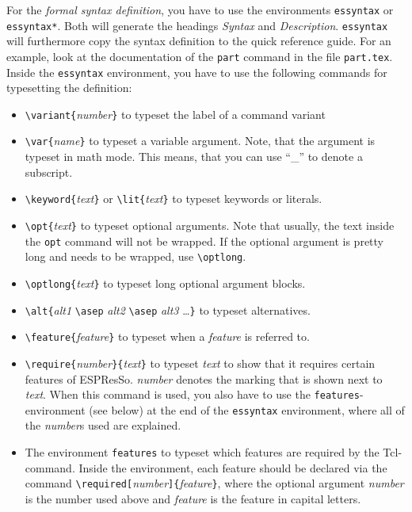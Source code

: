 \documentclass[
a4paper,                        %
11pt,                           %
twoside,                        %
footsepline,                    %
headsepline,                    %
headexclude,                    %
footexclude,                    %
pagesize,                       %
bibtotocnumbered,               %
idxtotoc                        %
]{scrreprt}
\newcommand{\es}{\mbox{\textsf{ESPResSo}}\xspace}
\begin{document}
For the \emph{formal syntax definition}, you have to use the
environments \texttt{essyntax} or \texttt{essyntax*}.  Both will
generate the headings \emph{Syntax} and
\emph{Description}. \texttt{essyntax} will furthermore copy the syntax
definition to the quick reference guide.  For an example, look at the
documentation of the \texttt{part} command in the file
\texttt{part.tex}. Inside the \texttt{essyntax} environment, you have
to use the following commands for typesetting the definition:
\begin{itemize}
\item \verb!\variant{!\textit{number}\verb!}! to typeset the label of a
  command variant
\item \verb!\var{!\textit{name}\verb!}! to typeset a variable
  argument. Note, that the argument is typeset in math mode.  This
  means, that you can use ``\_'' to denote a subscript.
\item \verb!\keyword{!\textit{text}\verb!}! or
  \verb!\lit{!\textit{text}\verb!}! to typeset keywords or literals.
\item \verb!\opt{!\textit{text}\verb!}! to typeset optional
  arguments. Note that usually, the text inside the \texttt{opt}
  command will not be wrapped. If the optional argument is pretty long
  and needs to be wrapped, use \verb!\optlong!.
\item \verb!\optlong{!\textit{text}\verb!}! to typeset long optional
  argument blocks.
\item \verb!\alt{!\textit{alt1} \verb!\asep! \textit{alt2}
    \verb!\asep! \textit{alt3} \dots \verb!}! to typeset alternatives.
\item \verb!\feature{!\textit{feature}\verb!}! to typeset when a
  \textit{feature} is referred to.
\item \verb!\require{!\textit{number}\verb!}{!\textit{text}\verb!}! to
  typeset \textit{text} to show that it requires certain features of
  \es. \textit{number} denotes the marking that is shown next to
  \textit{text}. When this command is used, you also have to use the
  \texttt{features}-environment (see below) at the end of the
  \texttt{essyntax} environment, where all of the \textit{number}s
  used are explained.
\item The environment \texttt{features} to typeset which features are
  required by the Tcl-command. Inside the environment, each feature
  should be declared via the command
  \verb!\required[!\textit{number}\verb!]{!\textit{feature}\verb!}!,
  where the optional argument \textit{number} is the number used above
  and \textit{feature} is the feature in capital letters.
\end{itemize}
\end{document}
